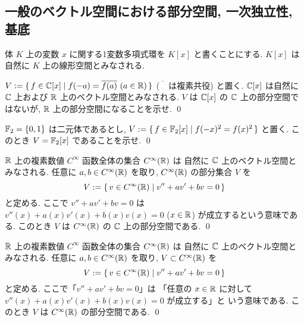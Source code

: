 \documentclass[12pt,twoside]{jarticle}
\begin{document}


\subsection{一般のベクトル空間における部分空間, 一次独立性, 基底}

体 $K$ 上の変数 $x$ に関する1変数多項式環を $K[x]$ と書くことにする.
$K[x]$ は自然に $K$ 上の線形空間とみなされる.

\begin{question}[5点]
  $V := \{\, f\in{\mathbb C}[x] \mid f(-a)=\overline{f(a)}\ (a\in{\mathbb R}) \,\}$ %
  ($\overline{\phantom{A}}$ は複素共役) と置く.
  ${\mathbb C}[x]$ は自然に ${\mathbb C}$ 上および ${\mathbb R}$ 上のベクトル空間とみなされる.
  $V$ は ${\mathbb C}[x]$ の ${\mathbb C}$ 上の部分空間ではないが, %
  ${\mathbb R}$ 上の部分空間になることを示せ.
  \qed
\end{question}

\begin{question}[5点]
  ${\mathbb F}_2=\{0,1\}$ は二元体であるとし, %
  $V:=\{\, f\in{\mathbb F}_2[x] \mid f(-x)^2=f(x)^2\,\}$ と置く.
  このとき $V={\mathbb F}_2[x]$ であることを示せ.
  \qed
\end{question}

\begin{question}[5点]
  ${\mathbb R}$ 上の複素数値 $C^\infty$ 函数全体の集合 $C^\infty({\mathbb R})$ は
  自然に ${\mathbb C}$ 上のベクトル空間とみなされる.
  任意に $a,b\in C^\infty({\mathbb R})$ を取り, $C^\infty({\mathbb R})$ の部分集合 $V$ を
  \begin{equation*}
    V := \{\, v\in C^\infty({\mathbb R})
    \mid v''+ av'+ bv = 0 \,\}
  \end{equation*}
  と定める. ここで $v''+ av'+ bv = 0$ は %
  $v''(x)+ a(x)v'(x)+ b(x)v(x) = 0$ ($x\in{\mathbb R}$) が成立するという意味である.
  このとき $V$ は $C^\infty({\mathbb R})$ の ${\mathbb C}$ 上の部分空間である.
  \qed
\end{question}

\begin{question}[二階の線形常微分方程式の解空間, 5点]
  \label{q:ODE-a,b}
  ${\mathbb R}$ 上の複素数値 $C^\infty$ 函数全体の集合 $C^\infty({\mathbb R})$ は
  自然に ${\mathbb C}$ 上のベクトル空間とみなされる.
  任意に $a,b\in C^\infty({\mathbb R})$ を取り, $V\subset C^\infty({\mathbb R})$ を
  \begin{equation*}
    V := \{\, v\in C^\infty({\mathbb R}) \mid v''+ av'+ bv = 0 \,\}
  \end{equation*}
  と定める. ここで「$v''+ av'+ bv = 0$」は %
  「任意の $x\in {\mathbb R}$ に対して $v''(x)+ a(x)v'(x)+ b(x)v(x) = 0$ が成立する」と
  いう意味である. このとき $V$ は $C^\infty({\mathbb R})$ の部分空間である.
  \qed
\end{question}
\end{document}
